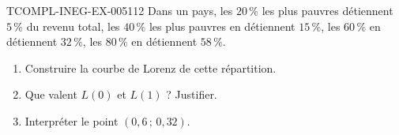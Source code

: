 \begin{exercice}{TCOMPL-INEG-EX-005}{1}{12}
Dans un pays, les $20\,\%$ les plus pauvres détiennent $5\,\%$ du revenu
total, les $40\,\%$ les plus pauvres en détiennent $15\,\%$, les $60\,\%$ en
détiennent $32\,\%$, les $80\,\%$ en détiennent $58\,\%$.
\begin{enumerate}
  \item Construire la courbe de Lorenz de cette répartition.
  \item Que valent $L(0)$ et $L(1)$ ? Justifier.
  \item Interpréter le point $(0{,}6\,;\,0{,}32)$.
\end{enumerate}
\end{exercice}
